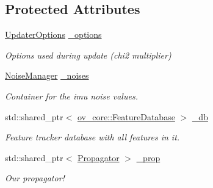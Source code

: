 \subsection*{Protected Attributes}
\begin{DoxyCompactItemize}
\item 
\mbox{\label{classov__msckf_1_1UpdaterZeroVelocity_a749638ff6ee8f1b0ba8eee2bef7e93e8}} 
\hyperlink{structov__msckf_1_1UpdaterOptions}{Updater\+Options} \hyperlink{classov__msckf_1_1UpdaterZeroVelocity_a749638ff6ee8f1b0ba8eee2bef7e93e8}{\+\_\+options}
\begin{DoxyCompactList}\small\item\em Options used during update (chi2 multiplier) \end{DoxyCompactList}\item 
\mbox{\label{classov__msckf_1_1UpdaterZeroVelocity_a40b315489e839b9f47168b13ff3ea625}} 
\hyperlink{structov__msckf_1_1NoiseManager}{Noise\+Manager} \hyperlink{classov__msckf_1_1UpdaterZeroVelocity_a40b315489e839b9f47168b13ff3ea625}{\+\_\+noises}
\begin{DoxyCompactList}\small\item\em Container for the imu noise values. \end{DoxyCompactList}\item 
\mbox{\label{classov__msckf_1_1UpdaterZeroVelocity_a8faef43ba67821767973ee9a78c173cc}} 
std\+::shared\+\_\+ptr$<$ \hyperlink{classov__core_1_1FeatureDatabase}{ov\+\_\+core\+::\+Feature\+Database} $>$ \hyperlink{classov__msckf_1_1UpdaterZeroVelocity_a8faef43ba67821767973ee9a78c173cc}{\+\_\+db}
\begin{DoxyCompactList}\small\item\em Feature tracker database with all features in it. \end{DoxyCompactList}\item 
\mbox{\label{classov__msckf_1_1UpdaterZeroVelocity_aff9a0009bd455014af4dea494fcb2b33}} 
std\+::shared\+\_\+ptr$<$ \hyperlink{classov__msckf_1_1Propagator}{Propagator} $>$ \hyperlink{classov__msckf_1_1UpdaterZeroVelocity_aff9a0009bd455014af4dea494fcb2b33}{\+\_\+prop}
\begin{DoxyCompactList}\small\item\em Our propagator! \end{DoxyCompactList}\item 

\end{DoxyCompactItemize}

